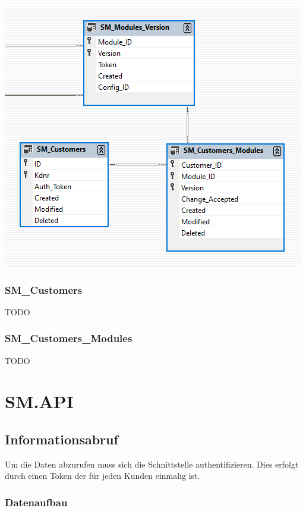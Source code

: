 \documentclass{article}
\begin{document}
\begin{center}
\includegraphics{db_customers}
\end{center}

\subsubsection{SM\_Customers}
TODO

\subsubsection{SM\_Customers\_Modules}
TODO


\section{SM.API}
\label{sec:sm.api}

\subsection{Informationsabruf}

Um die Daten abzurufen muss sich die Schnittstelle authentifizieren. Dies erfolgt durch einen Token der für jeden Kunden einmalig ist.

\subsubsection{Datenaufbau}
\end{document}
